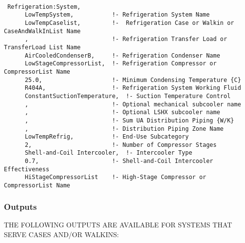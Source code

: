 \begin{lstlisting}

 Refrigeration:System,
      LowTempSystem,           !- Refrigeration System Name
      LowTempCaselist,         !-  Refrigeration Case or Walkin or CaseAndWalkInList Name
      ,                        !- Refrigeration Transfer Load or TransferLoad List Name
      AirCooledCondenserB,     !- Refrigeration Condenser Name
      LowStageCompressorList,  !- Refrigeration Compressor or CompressorList Name
      25.0,                    !- Minimum Condensing Temperature {C}
      R404A,                   !- Refrigeration System Working Fluid
      ConstantSuctionTemperature,  !- Suction Temperature Control
      ,                        !- Optional mechanical subcooler name
      ,                        !- Optional LSHX subcooler name
      ,                        !- Sum UA Distribution Piping {W/K}
      ,                        !- Distribution Piping Zone Name
      LowTempRefrig,           !- End-Use Subcategory
      2,                       !- Number of Compressor Stages
      Shell-and-Coil Intercooler,  !- Intercooler Type
      0.7,                     !- Shell-and-Coil Intercooler Effectiveness
      HiStageCompressorList    !- High-Stage Compressor or CompressorList Name
\end{lstlisting}

\subsubsection{Outputs}\label{outputs-2-018}

THE FOLLOWING OUTPUTS ARE AVAILABLE FOR SYSTEMS THAT SERVE CASES AND/OR WALKINS:

